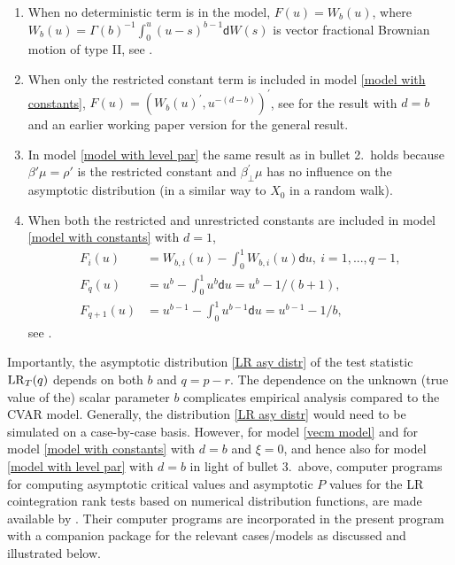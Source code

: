 \documentclass[article]{jss}
\def\lrt{{\rm LR}_T}
\begin{document}
 \begin{enumerate}
 \item When no deterministic term is in the model, $F(u)=W_{b}(u)$, where $W_{b}(u)=\Gamma(b)^{-1}\int_{0}^{u}(u-s)^{b-1}\mathsf{d}W(s)$ is vector fractional Brownian motion of type II, see \citet[Theorem 11(i)]{johansen2012likelihood}.
 \item When only the restricted constant term is included in model \eqref{model with constants}, $F(u)=(W_{b}(u)^{\prime},u^{-(d-b)})^{\prime }$, see \citet[Theorem 11(iv)]{johansen2012likelihood} for the result with $d=b$ and an earlier working paper version for the general result.
\item In model \eqref{model with level par} the same result as in bullet 2.\ holds because $\beta'\mu = \rho'$ is the restricted constant and $\beta_\perp^{\prime} \mu$ has no influence on the asymptotic distribution (in a similar way to $X_0$ in a random walk).
 \item When both the restricted and unrestricted constants are included in model \eqref{model with constants} with $d=1$,
\begin{align*}
F_{i}(u) &= W_{b,i}(u) - \int_{0}^{1} W_{b,i}(u) \mathsf{d} u, \ i=1,...,q-1, \\
F_{q}(u) &= u^{b} - \int_{0}^{1}u^{b} \mathsf{d} u=u^{b}-1/(b+1), \\
F_{q+1}(u) &= u^{b-1} - \int_{0}^{1}u^{b-1} \mathsf{d} u = u^{b-1}-1/b, 
\end{align*}
see \cite{Dolatabadi2014}.
\end{enumerate}

Importantly, the asymptotic distribution \eqref{LR asy distr} of the test statistic $\lrt(q)$ depends on both $b$ and $q=p-r$. The dependence on the unknown (true value of the) scalar parameter $b$ complicates empirical analysis compared to the CVAR model. Generally, the distribution \eqref{LR asy distr} would need to be simulated on a case-by-case basis. However, for model \eqref{vecm model} and for model \eqref{model with constants} with $d=b$ and $\xi=0$, and hence also for model \eqref{model with level par} with $d=b$ in light of bullet 3.\ above, computer programs for computing asymptotic critical values and asymptotic $P$ values for the LR cointegration rank tests based on numerical distribution functions, are made available by \cite{mackinnon2014numerical}. Their computer programs are incorporated in the present program with a companion  package  for the relevant cases/models as discussed and illustrated below.
\end{document}
